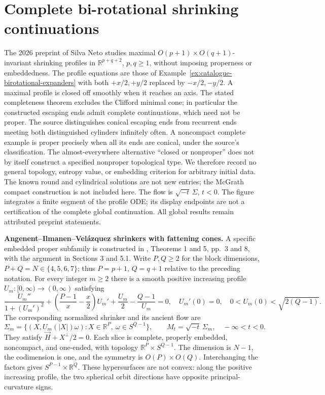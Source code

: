 \chapter{Complete bi-rotational shrinking continuations}\label{sec:catalogue-birotational-shrinkers}
\begin{example}\label{ex:catalogue-birotational-shrinkers}
The 2026 preprint of Silva Neto studies maximal $O(p+1)\times O(q+1)$-invariant shrinking profiles in $\mathbb R^{p+q+2}$, $p,q\ge1$, without imposing properness or embeddedness. The profile equations are those of Example~\ref{ex:catalogue-birotational-expanders} with both $+x/2,+y/2$ replaced by $-x/2,-y/2$. A maximal profile is closed off smoothly when it reaches an axis. The stated completeness theorem excludes the Clifford minimal cone; in particular the constructed escaping ends admit complete continuations, which need not be proper.
The source distinguishes conical escaping ends from recurrent ends meeting both distinguished cylinders infinitely often. A noncompact complete example is proper precisely when all its ends are conical, under the source's classification. The almost-everywhere alternative ``closed or nonproper'' does not by itself construct a specified nonproper topological type. We therefore record no general topology, entropy value, or embedding criterion for arbitrary initial data. The known round and cylindrical solutions are not new entries; the McGrath compact construction is not included here.
The flow is $\sqrt{-t}\,\Sigma$, $t<0$. The figure integrates a finite segment of the profile ODE; its display endpoints are not a certification of the complete global continuation. All global results remain attributed preprint statements.

\par\textbf{Angenent--Ilmanen--Vel\'azquez shrinkers with fattening cones.}
A specific embedded proper subfamily is constructed in \cite{CatAIV2002}, Theorems 1 and 5, pp.~3 and 8, with the argument in Sections 3 and 5.1. Write $P,Q\geq2$ for the block dimensions, $P+Q=N\in\{4,5,6,7\}$; thus $P=p+1$, $Q=q+1$ relative to the preceding notation. For every integer $m\geq2$ there is a smooth positive increasing profile $U_m:[0,\infty)\to(0,\infty)$ satisfying
\[
 \frac{U_m''}{1+(U_m')^2}+\left(\frac{P-1}{x}-\frac x2\right)U_m'
 +\frac{U_m}2-\frac{Q-1}{U_m}=0,
 \quad U_m'(0)=0,\quad 0<U_m(0)<\sqrt{2(Q-1)}.
\]
The corresponding normalized shrinker and its ancient flow are
\[
 \Sigma_m=\{(X,U_m(|X|)\omega):X\in\mathbb R^P,\ \omega\in S^{Q-1}\},
 \qquad M_t=\sqrt{-t}\,\Sigma_m,\quad -\infty<t<0.
\]
They satisfy $\vec H+X^\perp/2=0$. Each slice is complete, properly embedded, noncompact, and one-ended, with topology $\mathbb R^P\times S^{Q-1}$. The dimension is $N-1$, the codimension is one, and the symmetry is $O(P)\times O(Q)$. Interchanging the factors gives $S^{P-1}\times\mathbb R^Q$. These hypersurfaces are not convex: along the positive increasing profile, the two spherical orbit directions have opposite principal-curvature signs.


\end{example}

